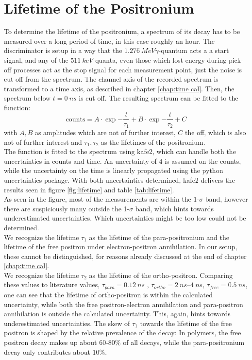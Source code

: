 \section{Lifetime of the Positronium}

To determine the lifetime of the positronium, a spectrum of its decay has to be measured over a long period of time, in this case roughly an hour. The discriminator is setup in a way that the $\SI{1.276}{MeV} \gamma$-quantum acts a a start signal, and any of the $\SI{511}{keV}$-quanta, even those which lost energy during pick-off processes act as the stop signal for each measurement point, just the noise is cut off from the spectrum. 
The channel axis of the recorded spectrum is transformed to a time axis, as described in chapter \ref{chap:time cal}. Then, the spectrum below $t = \SI{0}{ns}$ is cut off. The resulting spectrum can be fitted to the function: 
$$\mathrm{counts} = A\cdot\exp{-\frac{t}{\tau_1}}+ B\cdot\exp{-\frac{t}{\tau_2}} + C $$
with $A,B$ as amplitudes which are not of further interest, $C$ the off, which is also not of further interest and $\tau_1, \tau_2$ as the lifetimes of the positronium.\\
The function is fitted to the spectrum using kafe2, which can handle both the uncertainties in counts and time. An uncertainty of 4 is assumed on the counts, while the uncertainty on the time is linearly propagated using the python uncertainties package. With both uncertainties determined, kafe2 delivers the results seen in figure \ref{fig:lifetime} and table \ref{tab:lifetime}.\\ As seen in the figure, most of the measurements are within the 1-$\sigma$ band, however there are suspiciously many outside the 1-$\sigma$ band, which hints towards underestimated uncertainties. Which uncertainties might be too low could not be determined.\\
We recognize the lifetime $\tau_1$ as the lifetime of the para-positronium and the lifetime of the free positron under electron-positron annihilation. In our setup, these cannot be distinguished, for reasons already discussed at the end of chapter \ref{chap:time cal}. \\We recognize the lifetime $\tau_2$ as the lifetime of the ortho-positron.
Comparing these values to literature values\cite{BlueBook}, $\tau_{para} = \SI{0.12}{ns}$ , $\tau_{ortho} = \SIrange[]{2}{4}{ns}$, $\tau_{free} = \SI{0.5}{ns}$, one can see that the lifetime of ortho-positron is within the calculated uncertainty, while both the free positron-electron annihilation and para-positron annihilation is outside the calculated uncertainty. This, again, hints towards underestimated uncertainties. The skew of $\tau_1$ towards the lifetime of the free positron is shaped by the relative prevalence of the decay: In polymers, the free positron decay makes up about 60-80\% of all decays, while the para-positronium decay only contributes about 10\%.




